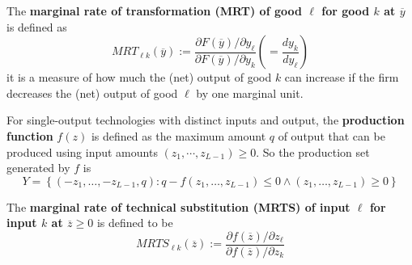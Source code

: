 \documentclass{article}
\begin{document}
	 		\begin{definition}
	 			The \textbf{marginal rate of transformation (MRT) of good $\ell$ for good $k$ at $\overline{y}$} is defined as 
	 			\begin{equation}
	 				M R T_{\ell k}(\overline{y}) := \frac{\partial F(\overline{y}) / \partial y_{\ell}}{\partial F(\overline{y}) / \partial y_{k}} \left ( = \frac{dy_k}{dy_\ell} \right )
	 			\end{equation}
	 			it is a measure of how much the (net) output of good $k$ can increase if the firm decreases the (net) output of good $\ell$ by one marginal unit.
	 		\end{definition}
	 		
	 		\begin{definition}
	 			For single-output technologies with distinct inputs and output, the \textbf{production function} $f(z)$ is defined as the maximum amount $q$ of output that can be produced using input amounts $(z_1, \cdots, z_{L-1}) \geq 0$. So the production set generated by $f$ is 
	 			\begin{equation}
	 				Y=\left\{\left(-z_{1}, \ldots,-z_{L-1}, q\right) : q-f\left(z_{1}, \ldots, z_{L-1}\right) \leq 0 \land \left(z_{1}, \ldots, z_{L-1}\right) \geq 0\right\}
	 			\end{equation}
	 		\end{definition}
	 		
	 		\begin{definition}
	 			The \textbf{marginal rate of technical substitution (MRTS) of input $\ell$ for input $k$ at $\overline{z} \geq 0$} is defined to be
	 			\begin{equation}
	 				MRTS_{\ell k}(\overline{z}) := \frac{\partial f(\overline{z}) / \partial z_{\ell}}{\partial f(\overline{z}) / \partial z_{k}}
	 			\end{equation}
	 		\end{definition}
	 		
\end{document}
